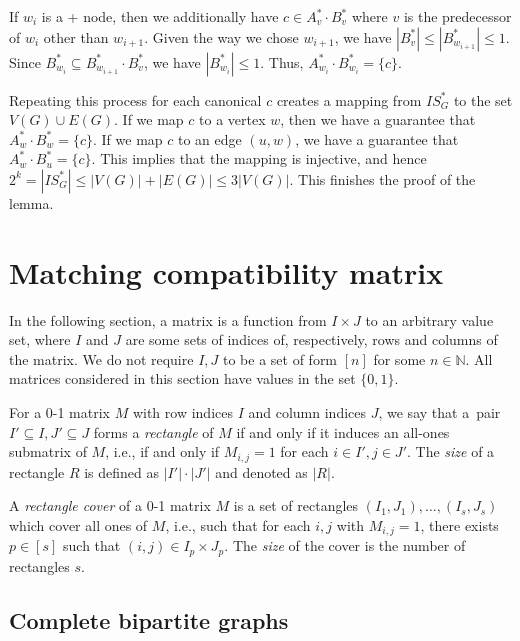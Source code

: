 If $w_i$ is a + node, then we additionally have $c \in A_v^* \cdot B_v^*$ where $v$ is the predecessor of $w_i$ other than $w_{i+1}$. Given the way we chose $w_{i+1}$, we have $|B_v^*| \leq |B_{w_{i+1}}^*| \leq 1$. Since $B_{w_i}^* \subseteq B_{w_{i+1}}^* \cdot B_v^*$, we have $|B_{w_i}^*| \leq 1$. Thus, $A_{w_i}^* \cdot B_{w_i}^* = \{c\}$.

Repeating this process for each canonical $c$ creates a mapping from $IS^*_G$ to the set $V(G) \cup E(G)$. If we map $c$ to a vertex $w$, then we have a guarantee that $A_w^* \cdot B_w^* = \{c\}$. If we map $c$ to an edge $(u,w)$, we have a guarantee that $A_w^* \cdot B_u^* = \{c\}$. This implies that the mapping is injective, and hence $2^k = |IS^*_G| \leq |V(G)| + |E(G)| \leq 3|V(G)|$. This finishes the proof of the lemma.




\section{Matching compatibility matrix}
\label{sec:match}

In the following section, a matrix is a function from $I \times J$ to an arbitrary value set, where $I$ and $J$ are some sets of indices of, respectively, rows and columns of the matrix. We do not require $I, J$ to be a set of form $[n]$ for some $n \in \mathbb{N}$. All matrices considered in this section have values in the set $\{0, 1\}$.

\begin{definition}
    For a 0-1 matrix $M$ with row indices $I$ and column indices $J$, we say that a~pair $I' \subseteq I, J' \subseteq J$ forms a \emph{rectangle} of $M$ if and only if it induces an all-ones submatrix of $M$, i.e., if and only if $M_{i,j} = 1$ for each $i \in I', j \in J'$. The \emph{size} of a rectangle $R$ is defined as $|I'| \cdot |J'|$ and denoted as $|R|$.
\end{definition}

\begin{definition}
    A \emph{rectangle cover} of a 0-1 matrix $M$ is a set of rectangles $(I_1, J_1), \dots, (I_s, J_s)$ which cover all ones of $M$, i.e., such that for each $i,j$ with $M_{i,j} = 1$, there exists $p \in [s]$ such that $(i, j) \in I_p \times J_p$. The \emph{size} of the cover is the number of rectangles $s$.
\end{definition}

\subsection{Complete bipartite graphs}

